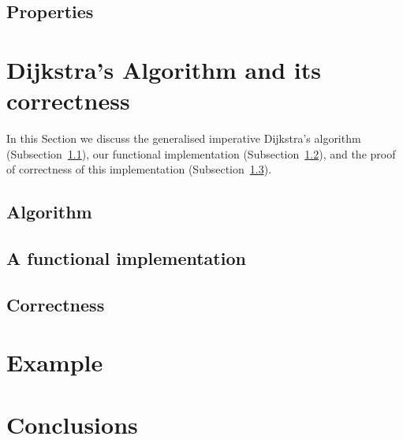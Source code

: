 \documentclass{llncs}
\begin{document}


\subsection{Properties}
\label{subsect.properties}



\section{Dijkstra's Algorithm and its correctness}
\label{sect.dijkstras.algorithm.and.its.correctness}

In this Section we discuss the generalised imperative Dijkstra's algorithm (Subsection~\ref{subsect.algorithm}), our functional implementation (Subsection~\ref{subsect.functional.implementation}), and the proof of correctness of this implementation (Subsection~\ref{subsect.correctness}).

\subsection{Algorithm}
\label{subsect.algorithm}



\subsection{A functional implementation}
\label{subsect.functional.implementation}



\subsection{Correctness}
\label{subsect.correctness}



\section{Example}
\label{sect.example}



\section{Conclusions}
\label{sect.conclusions}




\end{document}
